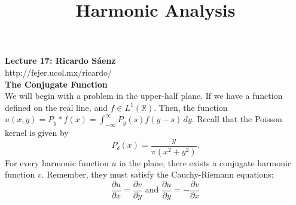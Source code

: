 \documentclass[12pt]{article}
\title{Harmonic Analysis}
\begin{document}
\noindent \textbf{Lecture 17: Ricardo S\'aenz} \\
\noindent http://fejer.ucol.mx/ricardo/ \\

\noindent \textbf{The Conjugate Function} \\
\noindent We will begin with a problem in the upper-half plane. If we have a function defined on the real line, and $f \in L^1(\mathbb{R})$. Then, the function $u(x,y) = P_y * f(x) = \int^\infty_{-\infty} P_y(s)f(y-s) \,dy$. Recall that the Poisson kernel is given by
$$ P_\delta (x) = \frac{y}{\pi(x^2+y^2)}.$$
For every harmonic function $u$ in the plane, there exists a conjugate harmonic function $v$. Remember, they must satisfy the Cauchy-Riemann equations:
$$\frac{\partial u}{\partial x} = \frac{\partial v}{\partial y}  \text{ and } \frac{\partial u}{\partial y} = -\frac{\partial v}{\partial x}$$
\end{document}
